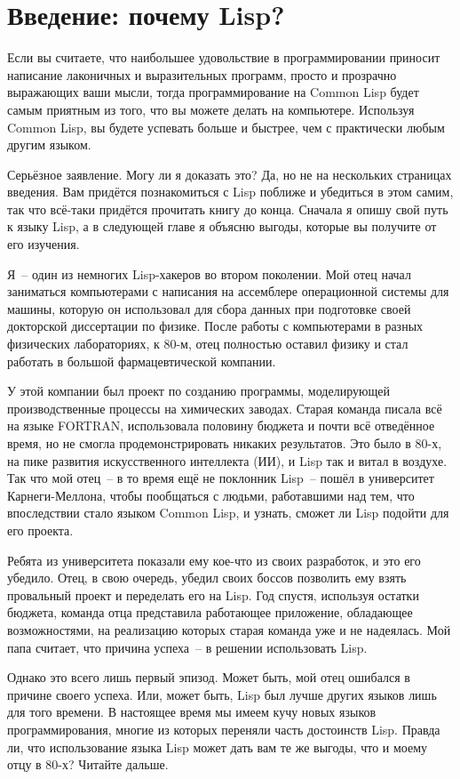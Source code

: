 \chapter{Введение: почему Lisp?}
\label{ch:01}

Если вы считаете, что наибольшее удовольствие в программировании приносит написание
лаконичных и выразительных программ, просто и прозрачно выражающих ваши мысли, тогда
программирование на Common Lisp будет самым приятным из того, что вы можете делать на
компьютере. Используя Common Lisp, вы будете успевать больше и быстрее, чем с
практически любым другим языком.

Серьёзное заявление. Могу ли я доказать это? Да, но не на нескольких страницах
введения. Вам придётся познакомиться с Lisp поближе и убедиться в этом самим, так что
всё-таки придётся прочитать книгу до конца. Сначала я опишу свой путь к языку Lisp, а в
следующей главе я объясню выгоды, которые вы получите от его изучения.

Я~-- один из немногих Lisp-хакеров во втором поколении. Мой отец начал заниматься
компьютерами с написания на ассемблере операционной системы для машины, которую он
использовал для сбора данных при подготовке своей докторской диссертации по физике. После
работы с компьютерами в разных физических лабораториях, к 80-м, отец полностью оставил
физику и стал работать в большой фармацевтической компании.

У этой компании был проект по созданию программы, моделирующей производственные процессы
на химических заводах. Старая команда писала всё на языке FORTRAN, использовала половину бюджета и
почти всё отведённое время, но не смогла продемонстрировать никаких результатов. Это было в
80-х, на пике развития искусственного интеллекта (ИИ), и Lisp так и витал в воздухе. Так что
мой отец~-- в то время ещё не поклонник Lisp~-- пошёл в университет Карнеги-Меллона,
чтобы пообщаться с людьми, работавшими над тем, что впоследствии стало языком Common Lisp, и
узнать, сможет ли Lisp подойти для его проекта.

Ребята из университета показали ему кое-что из своих разработок, и это его убедило. Отец,
в свою очередь, убедил своих боссов позволить ему взять провальный проект и переделать его на
Lisp. Год спустя, используя остатки бюджета, команда отца представила работающее
приложение, обладающее возможностями, на реализацию которых старая команда уже и не
надеялась. Мой папа считает, что причина успеха~-- в решении использовать Lisp.

Однако это всего лишь первый эпизод. Может быть, мой отец ошибался в причине своего
успеха. Или, может быть, Lisp был лучше других языков лишь для того времени. В настоящее
время мы имеем кучу новых языков программирования, многие из которых переняли часть
достоинств Lisp. Правда ли, что использование языка Lisp может дать вам те же выгоды,
что и моему отцу в 80-х? Читайте дальше.

